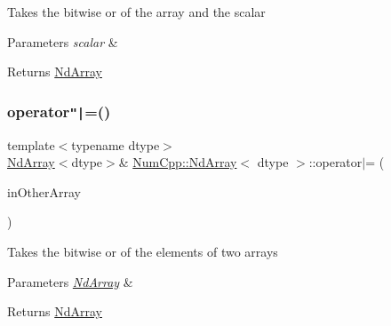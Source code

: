 Takes the bitwise or of the array and the scalar


\begin{DoxyParams}{Parameters}
{\em scalar} & \\
\hline
\end{DoxyParams}
\begin{DoxyReturn}{Returns}
\mbox{\hyperlink{class_num_cpp_1_1_nd_array}{Nd\+Array}} 
\end{DoxyReturn}
\mbox{\label{class_num_cpp_1_1_nd_array_aeaf25d48fe00c111273c7a4b3e80af24}} 
\subsubsection{\texorpdfstring{operator\texttt{"|}=()}{operator|=()}\hspace{0.1cm}{\footnotesize\ttfamily [1/2]}}
{\footnotesize\ttfamily template$<$typename dtype$>$ \\
\mbox{\hyperlink{class_num_cpp_1_1_nd_array}{Nd\+Array}}$<$dtype$>$\& \mbox{\hyperlink{class_num_cpp_1_1_nd_array}{Num\+Cpp\+::\+Nd\+Array}}$<$ dtype $>$\+::operator$\vert$= (\begin{DoxyParamCaption}\item[{const \mbox{\hyperlink{class_num_cpp_1_1_nd_array}{Nd\+Array}}$<$ dtype $>$ \&}]{in\+Other\+Array }\end{DoxyParamCaption})\hspace{0.3cm}{\ttfamily [inline]}}

Takes the bitwise or of the elements of two arrays


\begin{DoxyParams}{Parameters}
{\em \mbox{\hyperlink{class_num_cpp_1_1_nd_array}{Nd\+Array}}} & \\
\hline
\end{DoxyParams}
\begin{DoxyReturn}{Returns}
\mbox{\hyperlink{class_num_cpp_1_1_nd_array}{Nd\+Array}} 
\end{DoxyReturn}
\mbox{\label{class_num_cpp_1_1_nd_array_aae07ecfd7c8531ca9d9379e58f4b590d}} 
